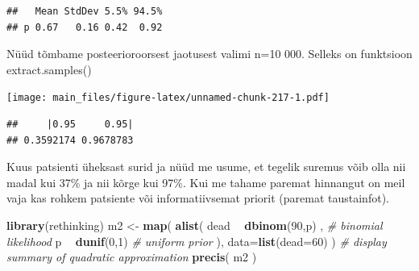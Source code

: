 \documentclass[]{book}
\newenvironment{Shaded}{\begin{snugshade}}{\end{snugshade}}
\newcommand{\KeywordTok}[1]{\textcolor[rgb]{0.13,0.29,0.53}{\textbf{#1}}}
\newcommand{\DataTypeTok}[1]{\textcolor[rgb]{0.13,0.29,0.53}{#1}}
\newcommand{\DecValTok}[1]{\textcolor[rgb]{0.00,0.00,0.81}{#1}}
\newcommand{\FloatTok}[1]{\textcolor[rgb]{0.00,0.00,0.81}{#1}}
\newcommand{\StringTok}[1]{\textcolor[rgb]{0.31,0.60,0.02}{#1}}
\newcommand{\CommentTok}[1]{\textcolor[rgb]{0.56,0.35,0.01}{\textit{#1}}}
\newcommand{\OperatorTok}[1]{\textcolor[rgb]{0.81,0.36,0.00}{\textbf{#1}}}
\newcommand{\NormalTok}[1]{#1}
\begin{document}
\begin{verbatim}
##   Mean StdDev 5.5% 94.5%
## p 0.67   0.16 0.42  0.92
\end{verbatim}

Nüüd tõmbame posteerioroorsest jaotusest valimi n=10 000. Selleks on
funktsioon extract.samples()

\begin{Shaded}
\end{Shaded}

\texttt{[image: main\_files/figure-latex/unnamed-chunk-217-1.pdf]}

\begin{Shaded}
\end{Shaded}

\begin{verbatim}
##     |0.95     0.95| 
## 0.3592174 0.9678783
\end{verbatim}

Kuus patsienti üheksast surid ja nüüd me usume, et tegelik suremus võib
olla nii madal kui 37\% ja nii kõrge kui 97\%. Kui me tahame paremat
hinnangut on meil vaja kas rohkem patsiente või informatiivsemat priorit
(paremat taustainfot).

\begin{Shaded}
\begin{Highlighting}[]
\KeywordTok{library}\NormalTok{(rethinking)}
\NormalTok{m2 <-}\StringTok{ }\KeywordTok{map}\NormalTok{(}
    \KeywordTok{alist}\NormalTok{(}
\NormalTok{        dead }\OperatorTok{~}\StringTok{ }\KeywordTok{dbinom}\NormalTok{(}\DecValTok{90}\NormalTok{,p) ,  }\CommentTok{# binomial likelihood}
\NormalTok{        p }\OperatorTok{~}\StringTok{ }\KeywordTok{dunif}\NormalTok{(}\DecValTok{0}\NormalTok{,}\DecValTok{1}\NormalTok{)     }\CommentTok{# uniform prior}
\NormalTok{), }\DataTypeTok{data=}\KeywordTok{list}\NormalTok{(}\DataTypeTok{dead=}\DecValTok{60}\NormalTok{) )}
\CommentTok{# display summary of quadratic approximation}
\KeywordTok{precis}\NormalTok{( m2 )}
\end{Highlighting}
\end{Shaded}
\end{document}
